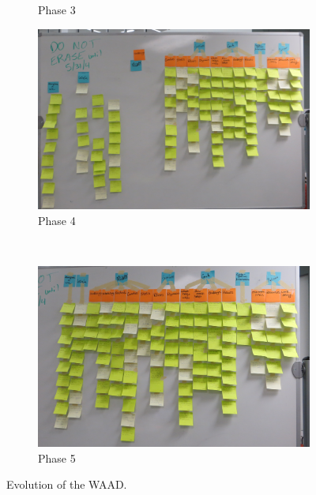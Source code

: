 \documentclass[12pt]{article} %
\begin{document}
\begin{figure}[H]
\begin{subfigure}{.5\linewidth}
\caption{Phase 3}
\label{fig:WAAD_version3}
\end{subfigure}%
\begin{subfigure}{.5\linewidth}
\centering
\includegraphics[width=0.95\linewidth]{WAAD_version4}
\caption{Phase 4}
\label{fig:WAAD_version4}
\end{subfigure}\\[1ex]
\begin{subfigure}{\linewidth}
\centering
\includegraphics[width=0.55\linewidth]{WAAD_version5}
\caption{Phase 5}
\label{fig:WAAD_version5}
\end{subfigure}
\caption{Evolution of the WAAD.}
\label{fig:WAAD}
\end{figure}
\end{document}
